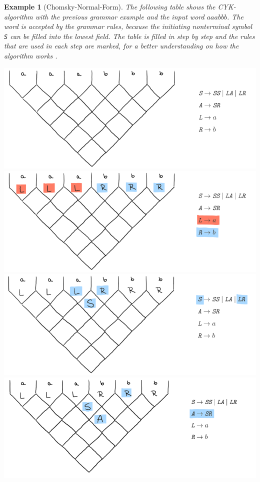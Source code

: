 \documentclass[a4paper, 11pt]{article}
\newtheorem*{example*}{Example}
\begin{document}
\begin{example*}[Chomsky-Normal-Form]
The following table shows the CYK-algorithm with the previous grammar example and the input word $aaabbb$. 
The word is accepted by the grammar rules, because the initiating nonterminal symbol \textit{\texttt{S}} can be filled into the lowest field. The table is filled in step by step and the rules that are used in each step are marked, for a better understanding on how the algorithm works \cite{cyk_online_alg}. 
\ \\

\begin{center}
\includegraphics[scale=0.9]{images/7.png} \\
\includegraphics[scale=0.9]{images/6.png} \\
\includegraphics[scale=0.9]{images/5.png} \\
\includegraphics[scale=0.9]{images/4.png} \\

\end{center}
\end{example*}
\end{document}
